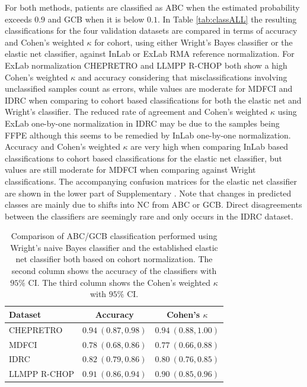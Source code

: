 \documentclass[10pt,letterpaper]{article}
\begin{document}
For both methods, patients are classified as ABC when the estimated probability exceeds $0.9$ and GCB when it is below $0.1$.
In Table \mbox{\ref{tab:classALL}} the resulting classifications for the four validation datasets are compared in terms of accuracy and Cohen's weighted $\kappa$ for cohort, using either Wright's Bayes classifier or the elastic net classifier, against InLab or ExLab RMA reference normalization.
For ExLab normalization CHEPRETRO and LLMPP R-CHOP both show a high Cohen's weighted $\kappa$ and accuracy considering that misclassifications involving unclassified samples count as errors, while values are moderate for MDFCI and IDRC when comparing to cohort based classifications for both the elastic net and Wright's classifier. 
The reduced rate of agreement and Cohen's weighted $\kappa$ using ExLab one-by-one normalization in IDRC may be due to the samples being FFPE although this seems to be remedied by InLab one-by-one normalization. Accuracy and Cohen's weighted $\kappa$ are very high when comparing InLab based classifications to cohort based classifications for the elastic net classifier, but values are still moderate for MDFCI when comparing against Wright classifications.
The accompanying confusion matrices for the elastic net classifier are shown in the lower part of Supplementary .
Note that changes in predicted classes are mainly due to shifts into NC from ABC or GCB.
Direct disagreements between the classifiers are seemingly rare and only occurs in the IDRC dataset.

%
\begin{table}[!tbp]
	{\small
		\caption{Comparison of ABC/GCB classification performed using Wright's naive
			Bayes classifier \cite{Wright2003} and the established elastic net classifier
			both based on cohort normalization.
			The second column shows the accuracy of the
			classifiers with $95\%$ CI. The third column shows the Cohen's weighted
			$\kappa$ with $95\%$ CI.\label{tab:ABCGCBclassifier}} 
		\begin{center}
			\begin{tabular}{lll}
				\hline\hline
				\multicolumn{1}{l}{Dataset}&\multicolumn{1}{c}{Accuracy}&\multicolumn{1}{c}{Cohen's $\kappa$}\tabularnewline
				\hline
				CHEPRETRO&$0.94~(0.87, 0.98)$&$0.94~(0.88, 1.00)$\tabularnewline
				MDFCI&$0.78~(0.68, 0.86)$&$0.77~(0.66, 0.88)$\tabularnewline
				IDRC&$0.82~(0.79, 0.86)$&$0.80~(0.76, 0.85)$\tabularnewline
				LLMPP R-CHOP&$0.91~(0.86, 0.94)$&$0.90~(0.85, 0.96)$\tabularnewline
				\hline
			\end{tabular}
		\end{center}}
\end{table}
\end{document}
